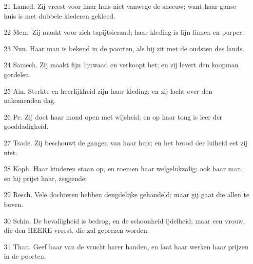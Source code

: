 \par 21 Lamed. Zij vreest voor haar huis niet vanwege de sneeuw; want haar ganse huis is met dubbele klederen gekleed.
\par 22 Mem. Zij maakt voor zich tapijtsieraad; haar kleding is fijn linnen en purper.
\par 23 Nun. Haar man is bekend in de poorten, als hij zit met de oudsten des lands.
\par 24 Samech. Zij maakt fijn lijnwaad en verkoopt het; en zij levert den koopman gordelen.
\par 25 Ain. Sterkte en heerlijkheid zijn haar kleding; en zij lacht over den nakomenden dag.
\par 26 Pe. Zij doet haar mond open met wijsheid; en op haar tong is leer der goeddadigheid.
\par 27 Tsade. Zij beschouwt de gangen van haar huis; en het brood der luiheid eet zij niet.
\par 28 Koph. Haar kinderen staan op, en roemen haar welgelukzalig; ook haar man, en hij prijst haar, zeggende:
\par 29 Resch. Vele dochteren hebben deugdelijke gehandeld; maar gij gaat die allen te boven.
\par 30 Schin. De bevalligheid is bedrog, en de schoonheid ijdelheid; maar een vrouw, die den HEERE vreest, die zal geprezen worden.
\par 31 Thau. Geef haar van de vrucht harer handen, en laat haar werken haar prijzen in de poorten.



